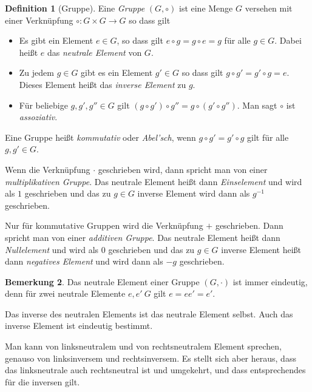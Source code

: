 \documentclass[index=totoc]{scrartcl}%
\theoremstyle{definition}
\newtheorem{defi}{Definition}[section]
\newtheorem{bem}[defi]{Bemerkung}
\begin{document}
\begin{defi}[Gruppe]
   
  Eine {\em Gruppe} $(G,\circ)$ ist eine Menge $G$
  versehen mit einer Verknüpfung $\circ\colon G\times G\to G$
  so dass gilt
  \begin{itemize}
  \item
    Es gibt ein Element $e\in G$, so dass gilt $e\circ g=g\circ e=g$
    für alle $g\in G$.
    Dabei heißt $e$ das {\em neutrale Element} von $G$.
  \item
    Zu jedem $g\in G$ gibt es ein Element $g'\in G$
    so dass gilt $g\circ g'=g'\circ g=e$.
    Dieses Element heißt das {\em inverse Element} zu $g$. 
  \item
    Für beliebige $g,g', g''\in G$ gilt
    $(g\circ g')\circ g''=g\circ (g'\circ g'')$.
    Man sagt $\circ$ ist {\em assoziativ}. 
  \end{itemize}

  Eine Gruppe heißt {\em kommutativ} oder {\em Abel'sch},
  wenn $g\circ g'=g'\circ g$ gilt für alle $g, g'\in G$.

  Wenn die Verknüpfung $\cdot$ geschrieben wird,
  dann spricht man von einer {\em multiplikativen Gruppe}.
  Das neutrale Element heißt dann {\em Einselement} und wird als $1$ geschrieben
  und das zu $g\in G$ inverse Element wird dann als $g^{-1}$ geschrieben.

  Nur für kommutative Gruppen wird die Verknüpfung $+$ geschrieben.
  Dann spricht man von einer {\em additiven Gruppe}.
  Das neutrale Element heißt dann {\em Nullelement} und wird als $0$ geschrieben
  und das zu $g\in G$ inverse Element heißt dann {\em negatives Element}
  und wird dann als $-g$ geschrieben.
\end{defi}

\begin{bem}
  Das neutrale Element einer Gruppe $(G, \cdot)$ ist immer eindeutig,
  denn für zwei neutrale Elemente $e,e'\ G$ gilt $e=ee'=e'$.
  
  Das inverse des neutralen Elements ist das neutrale Element selbst.
  Auch das inverse Element ist eindeutig bestimmt.

  Man kann von linksneutralem und von rechtsneutralem Element sprechen,
  genauso von linksinversem und rechtsinversem.
  Es stellt sich aber heraus, dass das linksneutrale auch rechtsneutral ist
  und umgekehrt, und dass entsprechendes für die inversen gilt. 
\end{bem}
\end{document}
